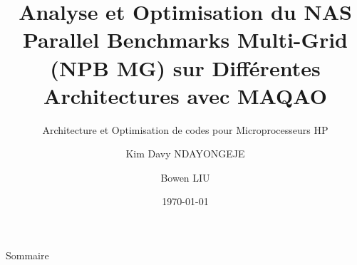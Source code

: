 \documentclass{beamer}
\title[]{\textbf{Analyse et Optimisation du NAS Parallel Benchmarks Multi-Grid (NPB MG) sur Différentes Architectures avec MAQAO}}
\subtitle{Architecture et Optimisation de codes pour Microprocesseurs HP}
\author[]{Kim Davy NDAYONGEJE \and Bowen LIU}
\institute[]{UVSQ - Université Paris-Saclay}
\date{\today}
\begin{document}
\begin{frame}[plain]
    \titlepage
\end{frame}

\begin{frame}[plain]{Sommaire}
    \tableofcontents
\end{frame}








\end{document}
